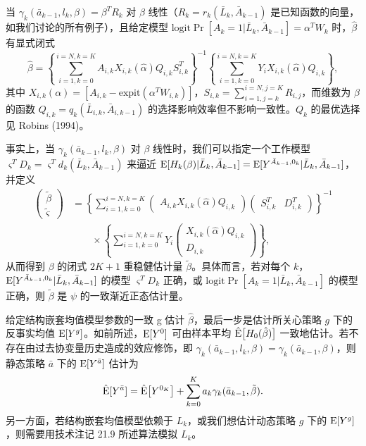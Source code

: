 \begin{techpoint}[线性结构嵌套均值模型的闭式估计量]
当 $\gamma_k(\bar a_{k-1},l_k,\beta)=\beta^TR_k$ 对 $\beta$ 线性（$R_k=r_k(\bar L_k,\bar A_{k-1})$ 是已知函数的向量，如我们讨论的所有例子），且给定模型 $\mathrm{logit}\Pr[A_k=1|\bar L_k,\bar A_{k-1}]=\alpha^TW_k$ 时，$\hat\beta$ 有显式闭式
\[
\hat\beta=\left\{\sum_{i=1,k=0}^{i=N,k=K}A_{i,k}X_{i,k}(\hat\alpha)Q_{i,k}S_{i,k}^{T}\right\}^{-1}\left\{\sum_{i=1,k=0}^{i=N,k=K}Y_iX_{i,k}(\hat\alpha)Q_{i,k}\right\},
\]
其中 $X_{i,k}(\alpha)=[A_{i,k}-\mathrm{expit}(\alpha^TW_{i,k})]$，$S_{i,k}=\sum_{i=1,j=k}^{i=N,j=K}R_{i,j}$，而维数为 $\beta$ 的函数 $Q_{i,k}=q_k(\bar L_{i,k},\bar A_{i,k-1})$ 的选择影响效率但不影响一致性。$Q_k$ 的最优选择见 Robins (1994)。

事实上，当 $\gamma_k(\bar a_{k-1},l_k,\beta)$ 对 $\beta$ 线性时，我们可以指定一个工作模型 $\varsigma^TD_k=\varsigma^Td_k(\bar L_k,\bar A_{k-1})$ 来逼近 $\mathrm{E}[H_k(\beta)|\bar L_k,\bar A_{k-1}]=\mathrm{E}[Y^{\bar A_{k-1},0_k}|\bar L_k,\bar A_{k-1}]$，并定义
\[
\begin{aligned}
\begin{pmatrix}\tilde\beta\\[2pt] \tilde\varsigma\end{pmatrix}
&=\left\{\sum_{i=1,k=0}^{i=N,k=K}
\begin{pmatrix}A_{i,k}X_{i,k}(\hat\alpha)Q_{i,k}\end{pmatrix}
\begin{pmatrix}S_{i,k}^{T} & D_{i,k}^{T}\end{pmatrix}\right\}^{-1}\\
&\qquad\times\left\{\sum_{i=1,k=0}^{i=N,k=K}Y_i
\begin{pmatrix}X_{i,k}(\hat\alpha)Q_{i,k}\\[2pt] D_{i,k}\end{pmatrix}\right\},
\end{aligned}
\]
从而得到 $\beta$ 的闭式 $2K+1$ 重稳健估计量 $\tilde\beta$。具体而言，若对每个 $k$，$\mathrm{E}[Y^{\bar A_{k-1},0_k}|\bar L_k,\bar A_{k-1}]$ 的模型 $\varsigma^TD_k$ 正确，或 $\mathrm{logit}\Pr[A_k=1|\bar L_k,\bar A_{k-1}]$ 的模型正确，则 $\tilde\beta$ 是 $\psi$ 的一致渐近正态估计量。
\end{techpoint}

给定结构嵌套均值模型参数的一致 g 估计 $\hat\beta$，最后一步是估计所关心策略 $g$ 下的反事实均值 $\mathrm{E}[Y^g]$。如前所述，$\mathrm{E}[Y^0]$ 可由样本平均 $\hat{\mathrm{E}}\big[H_0(\hat\beta)\big]$ 一致地估计。若不存在由过去协变量历史造成的效应修饰，即 $\gamma_k(\bar a_{k-1},l_k,\beta)=\gamma_k(\bar a_{k-1},\beta)$，则静态策略 $\bar a$ 下的 $\mathrm{E}[Y^{\bar a}]$ 估计为
\[
\hat{\mathrm{E}}[Y^{\bar a}]=\hat{\mathrm{E}}\big[Y^{0_K}\big]+\sum_{k=0}^{K}a_k\gamma_k(\bar a_{k-1},\tilde\beta).
\]
另一方面，若结构嵌套均值模型依赖于 $L_k$，或我们想估计动态策略 $g$ 下的 $\mathrm{E}[Y^g]$，则需要用技术注记 21.9 所述算法模拟 $L_k$。

